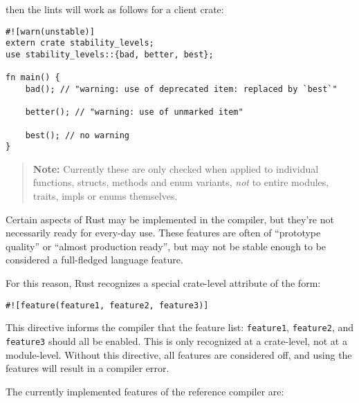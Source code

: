 \documentclass[]{article}
\begin{document}
then the lints will work as follows for a client crate:

\begin{verbatim}
#![warn(unstable)]
extern crate stability_levels;
use stability_levels::{bad, better, best};

fn main() {
    bad(); // "warning: use of deprecated item: replaced by `best`"

    better(); // "warning: use of unmarked item"

    best(); // no warning
}
\end{verbatim}

\begin{quote}
\textbf{Note:} Currently these are only checked when applied to
individual functions, structs, methods and enum variants, \emph{not} to
entire modules, traits, impls or enums themselves.
\end{quote}


Certain aspects of Rust may be implemented in the compiler, but they're
not necessarily ready for every-day use. These features are often of
``prototype quality'' or ``almost production ready'', but may not be
stable enough to be considered a full-fledged language feature.

For this reason, Rust recognizes a special crate-level attribute of the
form:

\begin{verbatim}
#![feature(feature1, feature2, feature3)]
\end{verbatim}

This directive informs the compiler that the feature list:
\texttt{feature1}, \texttt{feature2}, and \texttt{feature3} should all
be enabled. This is only recognized at a crate-level, not at a
module-level. Without this directive, all features are considered off,
and using the features will result in a compiler error.

The currently implemented features of the reference compiler are:
\end{document}
